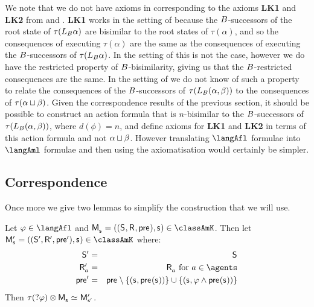 We note that we do not have axioms in \logicAflS{} corresponding to the axioms {\bf LK1} and {\bf LK2} from \axiomAflK{} and \axiomAflKFF{}.
{\bf LK1} works in the setting of \classK{} because the $B$-successors of the root state of $\tau({L_{B}} \alpha)$ are bisimilar to the root states of $\tau(\alpha)$, and so the consequences of executing $\tau(\alpha)$ are the same as the consequences of executing the $B$-successors of $\tau({L_{B}} \alpha)$.
In the setting of \classKFF{} this is not the case, however we do have the restricted property of $B$-bisimilarity, giving us that the $B$-restricted consequences are the same.
In the setting of \classS{} we do not know of such a property to relate the consequences of the $B$-successors of $\tau({L_{B}} (\alpha, \beta))$ to the consequences of $\tau(\alpha \sqcup \beta)$.
Given the correspondence results of the previous section, it should be possible to construct an action formula that is $n$-bisimilar to the $B$-successors of $\tau({L_{B}} (\alpha, \beta))$, where $d(\phi) = n$, and define axioms for {\bf LK1} and {\bf LK2} in terms of this action formula and not $\alpha \sqcup \beta$.
However translating $\langAfl$ formulae into $\langAml$ formulae and then using the axiomatisation \axiomAmlS{} would certainly be simpler.

\subsection{Correspondence}

Once more we give two lemmas to simplify the construction that we will use.

\begin{lemma}\label{afl-s-construction-test}
Let $\phi \in \langAfl$ and $\aPModel{\aStateS} = \aPModelTuple{\aStateS} \in \classAmK$.
Then let $\aPModelP{\aStateS} = \aPModelTupleP{\aStateS} \in \classAmK$ where:
\begin{eqnarray*}
    \aStatesP &=& \aStates\\
    \aAccessibilityP{\agentA} &=& \aAccessibility{\agentA} \text{ for } \agentA \in \agents\\
    \aPreconditionP &=& \aPrecondition \setminus \{(\aStateS, \aPrecondition(\aStateS))\} \cup \{(\aStateS, \phi \land \aPrecondition(\aStateS))\}
\end{eqnarray*}
Then $\tau(\test{\phi}) \exec \aPModel{\aStateS} \bisimilar \aPModelP{\aStateSP}$.
\end{lemma}

